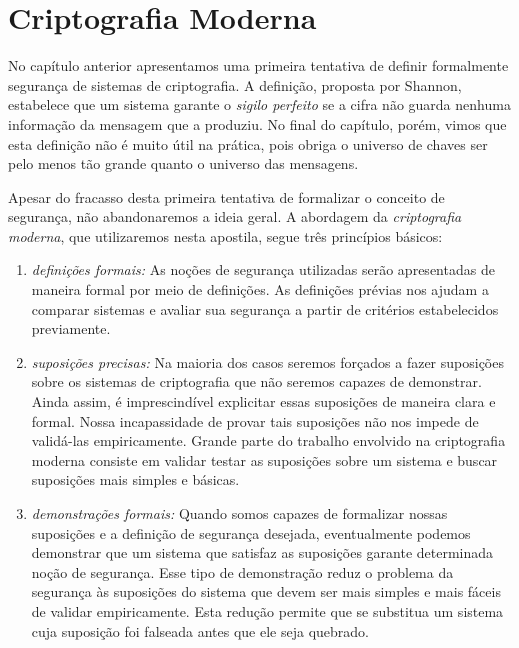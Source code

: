 \chapter{Criptografia Moderna}
\label{cha:criptografia-moderna}

No capítulo anterior apresentamos uma primeira tentativa de definir formalmente segurança de sistemas de criptografia.
A definição, proposta por Shannon, estabelece que um sistema garante o {\em sigilo perfeito} se a cifra não guarda nenhuma informação da mensagem que a produziu.
No final do capítulo, porém, vimos que esta definição não é muito útil na prática, pois obriga o universo de chaves ser pelo menos tão grande quanto o universo das mensagens.

Apesar do fracasso desta primeira tentativa de formalizar o conceito de segurança, não abandonaremos a ideia geral.
A abordagem da {\em criptografia moderna}, que utilizaremos nesta apostila, segue três princípios básicos:
\begin{enumerate}
\item {\em definições formais:} As noções de segurança utilizadas serão apresentadas de maneira formal por meio de definições. 
As definições prévias nos ajudam a comparar sistemas e avaliar sua segurança a partir de critérios estabelecidos previamente.
\item {\em suposições precisas:} Na maioria dos casos seremos forçados a fazer suposições sobre os sistemas de criptografia que não seremos capazes de demonstrar.
Ainda assim, é imprescindível explicitar essas suposições de maneira clara e formal.
Nossa incapassidade de provar tais suposições não nos impede de validá-las empiricamente.
Grande parte do trabalho envolvido na criptografia moderna consiste em validar testar as suposições sobre um sistema e buscar suposições mais simples e básicas.
\item {\em demonstrações formais:} Quando somos capazes de formalizar nossas suposições e a definição de segurança desejada, eventualmente podemos demonstrar que um sistema que satisfaz as suposições garante determinada noção de segurança.
Esse tipo de demonstração reduz o problema da segurança às suposições do sistema que devem ser mais simples e mais fáceis de validar empiricamente.
Esta redução permite que se substitua um sistema cuja suposição foi falseada antes que ele seja quebrado.
\end{enumerate}

